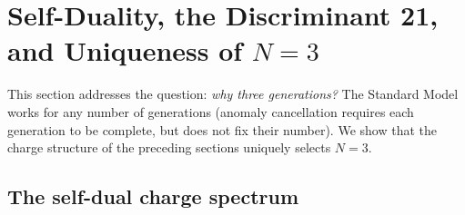 \documentclass[12pt,a4paper]{article}
\begin{document}
\section{Self-Duality, the Discriminant 21, and Uniqueness of $N=3$}
\label{sec:uniqueness}

This section addresses the question: \emph{why three generations?}
The Standard Model works for any number of generations
(anomaly cancellation requires each generation to be complete, but
does not fix their number). We show that the charge structure of
the preceding sections uniquely selects $N = 3$.

\subsection{The self-dual charge spectrum}
\end{document}
